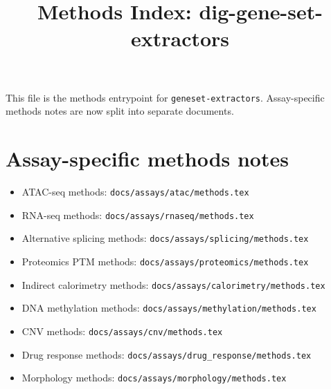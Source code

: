 \documentclass[11pt]{article}
\title{Methods Index: dig-gene-set-extractors}
\author{}
\date{}
\begin{document}
\maketitle

This file is the methods entrypoint for \texttt{geneset-extractors}.
Assay-specific methods notes are now split into separate documents.

\section*{Assay-specific methods notes}
\begin{itemize}[leftmargin=2em]
\item ATAC-seq methods: \texttt{docs/assays/atac/methods.tex}
\item RNA-seq methods: \texttt{docs/assays/rnaseq/methods.tex}
\item Alternative splicing methods: \texttt{docs/assays/splicing/methods.tex}
\item Proteomics PTM methods: \texttt{docs/assays/proteomics/methods.tex}
\item Indirect calorimetry methods: \texttt{docs/assays/calorimetry/methods.tex}
\item DNA methylation methods: \texttt{docs/assays/methylation/methods.tex}
\item CNV methods: \texttt{docs/assays/cnv/methods.tex}
\item Drug response methods: \texttt{docs/assays/drug\_response/methods.tex}
\item Morphology methods: \texttt{docs/assays/morphology/methods.tex}
\end{itemize}
\end{document}
